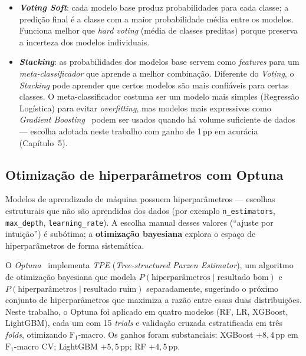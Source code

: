 \begin{itemize}
  \item \textbf{\emph{Voting Soft}}: cada modelo base produz probabilidades para cada classe; a predição final é a classe com a maior probabilidade média entre os modelos. Funciona melhor que \emph{hard voting} (média de classes preditas) porque preserva a incerteza dos modelos individuais.
  \item \textbf{\emph{Stacking}}: as probabilidades dos modelos base servem como \emph{features} para um \emph{meta-classificador} que aprende a melhor combinação. Diferente do \emph{Voting}, o \emph{Stacking} pode aprender que certos modelos são mais confiáveis para certas classes. O meta-classificador costuma ser um modelo mais simples (Regressão Logística) para evitar \emph{overfitting}, mas modelos mais expressivos como \emph{Gradient Boosting}~\cite{friedman2001greedy} podem ser usados quando há volume suficiente de dados --- escolha adotada neste trabalho com ganho de 1\,pp em acurácia (Capítulo~5).
\end{itemize}


\subsection{Otimização de hiperparâmetros com Optuna}
\label{sec:fund_optuna}

Modelos de aprendizado de máquina possuem hiperparâmetros --- escolhas estruturais que não são aprendidas dos dados (por exemplo \texttt{n\_estimators}, \texttt{max\_depth}, \texttt{learning\_rate}). A escolha manual desses valores (``ajuste por intuição'') é subótima; a \textbf{otimização bayesiana} explora o espaço de hiperparâmetros de forma sistemática.

O \emph{Optuna}~\cite{akiba2019optuna} implementa \emph{TPE} (\emph{Tree-structured Parzen Estimator}), um algoritmo de otimização bayesiana que modela \(P(\text{hiperparâmetros} \mid \text{resultado bom})\) e \(P(\text{hiperparâmetros} \mid \text{resultado ruim})\) separadamente, sugerindo o próximo conjunto de hiperparâmetros que maximiza a razão entre essas duas distribuições. Neste trabalho, o Optuna foi aplicado em quatro modelos (RF, LR, XGBoost, LightGBM), cada um com 15 \emph{trials} e validação cruzada estratificada em três \emph{folds}, otimizando \(\text{F}_1\)-macro. Os ganhos foram substanciais: XGBoost \(+8,4\,\text{pp}\) em \(\text{F}_1\)-macro CV; LightGBM \(+5,5\,\text{pp}\); RF \(+4,5\,\text{pp}\).

